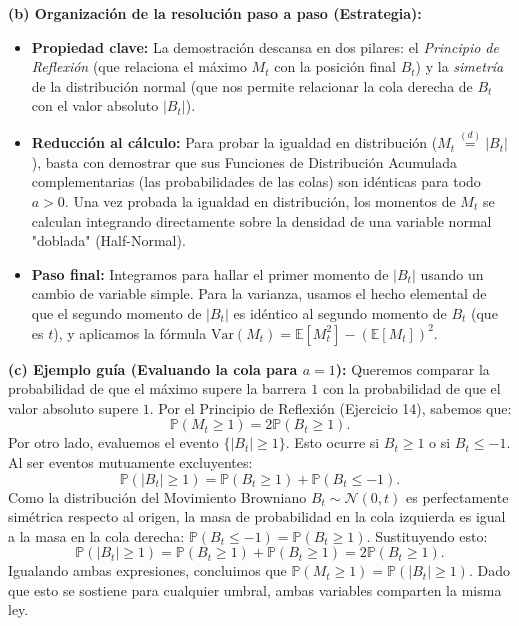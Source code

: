 \documentclass[11pt, letterpaper]{article}
\begin{document}
\begin{solucion}
    \textbf{(b) Organización de la resolución paso a paso (Estrategia):}
    \begin{itemize}
        \item[(i)] \textbf{Propiedad clave:} La demostración descansa en dos pilares: el \textit{Principio de Reflexión} (que relaciona el máximo $M_t$ con la posición final $B_t$) y la \textit{simetría} de la distribución normal (que nos permite relacionar la cola derecha de $B_t$ con el valor absoluto $|B_t|$).
        \item[(ii)] \textbf{Reducción al cálculo:} Para probar la igualdad en distribución ($M_t \stackrel{(d)}{=} |B_t|$), basta con demostrar que sus Funciones de Distribución Acumulada complementarias (las probabilidades de las colas) son idénticas para todo $a > 0$. Una vez probada la igualdad en distribución, los momentos de $M_t$ se calculan integrando directamente sobre la densidad de una variable normal "doblada" (Half-Normal).
        \item[(iii)] \textbf{Paso final:} Integramos para hallar el primer momento de $|B_t|$ usando un cambio de variable simple. Para la varianza, usamos el hecho elemental de que el segundo momento de $|B_t|$ es idéntico al segundo momento de $B_t$ (que es $t$), y aplicamos la fórmula $\text{Var}(M_t) = \mathbb{E}[M_t^2] - (\mathbb{E}[M_t])^2$.
    \end{itemize}

    \vspace{3mm}
    \textbf{(c) Ejemplo guía (Evaluando la cola para $a = 1$):}
    Queremos comparar la probabilidad de que el máximo supere la barrera $1$ con la probabilidad de que el valor absoluto supere $1$.
    Por el Principio de Reflexión (Ejercicio 14), sabemos que:
    \[ \mathbb{P}(M_t \ge 1) = 2\mathbb{P}(B_t \ge 1). \]
    Por otro lado, evaluemos el evento $\{|B_t| \ge 1\}$. Esto ocurre si $B_t \ge 1$ o si $B_t \le -1$. Al ser eventos mutuamente excluyentes:
    \[ \mathbb{P}(|B_t| \ge 1) = \mathbb{P}(B_t \ge 1) + \mathbb{P}(B_t \le -1). \]
    Como la distribución del Movimiento Browniano $B_t \sim \mathcal{N}(0, t)$ es perfectamente simétrica respecto al origen, la masa de probabilidad en la cola izquierda es igual a la masa en la cola derecha: $\mathbb{P}(B_t \le -1) = \mathbb{P}(B_t \ge 1)$.
    Sustituyendo esto:
    \[ \mathbb{P}(|B_t| \ge 1) = \mathbb{P}(B_t \ge 1) + \mathbb{P}(B_t \ge 1) = 2\mathbb{P}(B_t \ge 1). \]
    Igualando ambas expresiones, concluimos que $\mathbb{P}(M_t \ge 1) = \mathbb{P}(|B_t| \ge 1)$. Dado que esto se sostiene para cualquier umbral, ambas variables comparten la misma ley.


\end{solucion}
\end{document}
